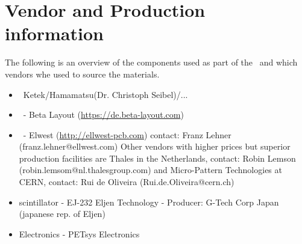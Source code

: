 \documentclass[../BTOF_summary.tex]{subfiles}
\begin{document}
\section{Vendor and Production information}

The following is an overview of the components used as part of the \btofD\ and which vendors whe used to source the materials.

\begin{itemize}
    \item \sipms\ Ketek/Hamamatsu(Dr. Christoph Seibel)/... 
    \item \sensorboard\ - Beta Layout (\url{https://de.beta-layout.com})
    \item \railboard\ - Elwest (\url{http://ellwest-pcb.com}) contact: Franz Lehner (franz.lehner@ellwest.com)
    Other vendors with higher prices but superior production facilities are Thales in the Netherlands, contact: Robin Lemson (robin.lemsom@nl.thalesgroup.com) and Micro-Pattern Technologies at CERN, contact: Rui de Oliveira (Rui.de.Oliveira@cern.ch)
    \item scintillator - EJ-232 Eljen Technology - Producer: G-Tech Corp Japan (japanese rep. of Eljen)
    \item Electronics - PETsys Electronics
\end{itemize}
\end{document}
